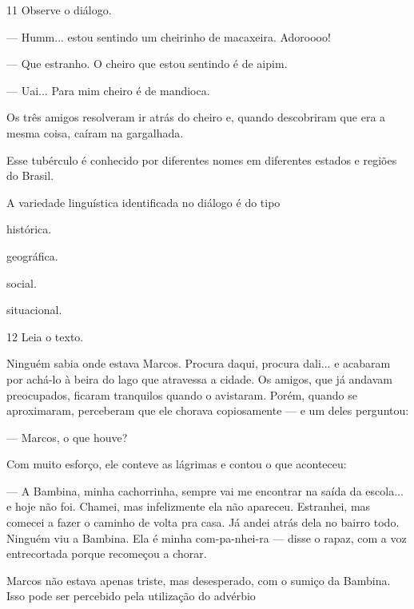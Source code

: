 \num{11} Observe o diálogo.

\begin{myquote}
--- Humm... estou sentindo um cheirinho de macaxeira. Adoroooo!

--- Que estranho. O cheiro que estou sentindo é de aipim.

--- Uai... Para mim cheiro é de mandioca.

Os três amigos resolveram ir atrás do cheiro e, quando descobriram que
era a mesma coisa, caíram na gargalhada.
\end{myquote}

Esse tubérculo é conhecido por diferentes nomes em diferentes
estados e regiões do Brasil.

A variedade linguística identificada no diálogo é do tipo

\begin{escolha}
\item histórica.

\item geográfica.

\item social.

\item situacional.
\end{escolha}

\num{12} Leia o texto.

\begin{myquote}
Ninguém sabia onde estava Marcos. Procura daqui, procura dali... e
acabaram por achá-lo à beira do lago que atravessa a cidade. Os amigos,
que já andavam preocupados, ficaram tranquilos quando o avistaram.
Porém, quando se aproximaram, perceberam que ele chorava copiosamente
--- e um deles perguntou:

--- Marcos, o que houve?

Com muito esforço, ele conteve as lágrimas e contou o que aconteceu:

--- A Bambina, minha cachorrinha, sempre vai me encontrar na saída da
escola... e hoje não foi. Chamei, mas infelizmente ela não apareceu.
Estranhei, mas comecei a fazer o caminho de volta pra casa. Já andei
atrás dela no bairro todo. Ninguém viu a Bambina. Ela é minha
com-pa-nhei-ra --- disse o rapaz, com a voz entrecortada porque
recomeçou a chorar.

\end{myquote}

Marcos não estava apenas triste, mas desesperado, com o sumiço da
Bambina. Isso pode ser percebido pela utilização do advérbio

